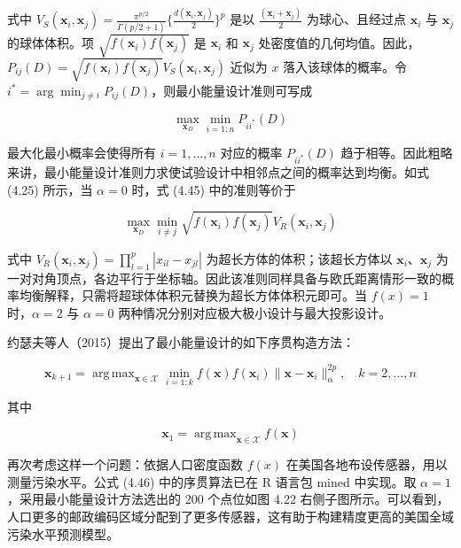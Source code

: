 \documentclass{ctexart}
\DeclareMathOperator*{\argmax}{arg\,max}
\begin{document}
式中 $V_S(\boldsymbol{x}_i,\boldsymbol{x}_j)=\frac{\pi^{p/2}}{\Gamma(p/2+1)}\{\frac{d(\boldsymbol{x}_i,\boldsymbol{x}_j)}{2}\}^p$ 是以 $\frac{(\boldsymbol{x}_i+\boldsymbol{x}_j)}{2}$ 为球心、且经过点 $\boldsymbol{x}_i$ 与 $\boldsymbol{x}_j$ 的球体体积。项 $\sqrt{f(\boldsymbol{x}_i)f(\boldsymbol{x}_j)}$ 是 $\boldsymbol{x}_i$ 和 $\boldsymbol{x}_j$ 处密度值的几何均值。因此，$P_{ij}(D)=\sqrt{f(\boldsymbol{x}_i)f(\boldsymbol{x}_j)}V_S(\boldsymbol{x}_i,\boldsymbol{x}_j)$ 近似为 $x$ 落入该球体的概率。令 $i^*=\arg\min_{j\neq i}P_{ij}(D)$，则最小能量设计准则可写成

\begin{equation*}
\max_{\boldsymbol{x}_{D}}\min_{i=1:n}P_{ii^*}(D)
\end{equation*}

最大化最小概率会使得所有 $i=1,\dots,n$ 对应的概率 $P_{ii^*}(D)$ 趋于相等。因此粗略来讲，最小能量设计准则力求使试验设计中相邻点之间的概率达到均衡。如式 (4.25) 所示，当 $\alpha=0$ 时，式 (4.45) 中的准则等价于

\begin{equation*}
\max_{\boldsymbol{x}_{D}}\min_{i\neq j}\sqrt{f(\boldsymbol{x}_i)f(\boldsymbol{x}_j)}V_R(\boldsymbol{x}_i,\boldsymbol{x}_j)
\end{equation*}

式中 $V_R(\boldsymbol{x}_i,\boldsymbol{x}_j)=\prod_{l=1}^{p}|x_{il}-x_{jl}|$ 为超长方体的体积；该超长方体以 $\boldsymbol{x}_i$、$\boldsymbol{x}_j$ 为一对对角顶点，各边平行于坐标轴。因此该准则同样具备与欧氏距离情形一致的概率均衡解释，只需将超球体体积元替换为超长方体体积元即可。当 $f(x)=1$ 时，$\alpha=2$ 与 $\alpha=0$ 两种情况分别对应极大极小设计与最大投影设计。

约瑟夫等人（2015）提出了最小能量设计的如下序贯构造方法：

\begin{equation*}
\boldsymbol{x}_{k+1}=\argmax_{\boldsymbol{x}\in \mathcal{X}}\min_{i=1:k} f(\boldsymbol{x})f(\boldsymbol{x}_i)\|\boldsymbol{x}-\boldsymbol{x}_i\|^{2p}_\alpha,\quad k=2,\dots,n
\tag{4.46}
\end{equation*}

其中

\begin{equation*}
\boldsymbol{x}_1=\argmax_{\boldsymbol{x}\in \mathcal{X}}f(\boldsymbol{x})
\end{equation*}

再次考虑这样一个问题：依据人口密度函数 $f(x)$ 在美国各地布设传感器，用以测量污染水平。公式 (4.46) 中的序贯算法已在 R 语言包 mined 中实现。取 $\alpha=1$，采用最小能量设计方法选出的 200 个点位如图 4.22 右侧子图所示。可以看到，人口更多的邮政编码区域分配到了更多传感器，这有助于构建精度更高的美国全域污染水平预测模型。
\end{document}
